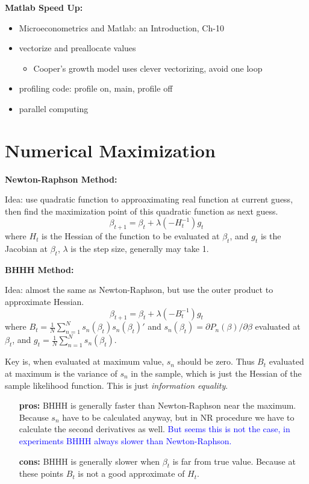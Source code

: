 \documentclass{book}
\theoremstyle{plain}
\theoremstyle{definition}
\begin{document}
\noindent
\textbf{Matlab Speed Up:}
\begin{itemize}
	\item Microeconometrics and Matlab: an Introduction, Ch-10
	\item vectorize and preallocate values
		\begin{itemize}
		 	\item Cooper's growth model uses clever vectorizing, avoid one loop
		 \end{itemize} 
	\item profiling code: profile on, main, profile off
	\item parallel computing
\end{itemize}

\section{Numerical Maximization} %
\label{sec:numerical_maximization}

\noindent
\textbf{Newton-Raphson Method:}

Idea: use quadratic function to approaximating real function at current guess,
then find the maximization point of this quadratic function as next guess.
\[\beta_{t+1}=\beta_t + \lambda(-H^{-1}_t)g_t\]
where $H_t$ is the Hessian of the function to be evaluated at $\beta_t$, 
and $g_t$ is the Jacobian at $\beta_t$,
$\lambda$ is the step size, generally may take 1.

\vspace{3mm}
\noindent
\textbf{BHHH Method:}

Idea: almost the same as Newton-Raphson, but use the outer product to approximate Hessian.
\[\beta_{t+1}=\beta_t + \lambda(-B^{-1}_t)g_t\]
where $B_t = \frac{1}{N}\sum_{n=1}^N{s_n(\beta_t)s_n(\beta_t)'}$
and $s_n(\beta_t)= \partial P_n(\beta)/\partial \beta$ evaluated at $\beta_t$,
and $g_t=\frac{1}{N}\sum_{n=1}^N{s_n(\beta_t)}$.

Key is, when evaluated at maximum value, $s_n$ should be zero. Thus $B_t$ evaluated at maximum is the variance of $s_n$ in the sample, which is just the Hessian of the sample likelihood function.
This is just \textit{information equality}.

\begin{itemize}
	\item [\textbf{pros:}] BHHH is generally faster than Newton-Raphson near the maximum.
	Because $s_n$ have to be calculated anyway, 
	but in NR procedure we have to calculate the second derivatives as well.
	\textcolor{blue}{But seems this is not the case, in experiments BHHH always slower than Newton-Raphson.}
	\item [\textbf{cons:}] BHHH is generally slower when $\beta_t$ is far from true value. 
	Because at these points $B_t$ is not a good approximate of $H_t$.
\end{itemize}
\end{document}
